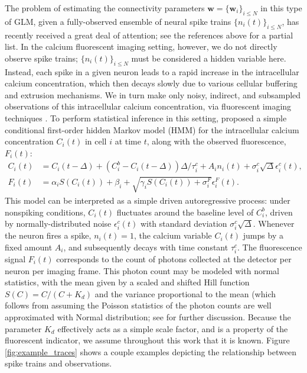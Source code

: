 \documentclass[aoas,preprint]{imsart}
\newcommand{\w}{w}
\newcommand{\bw}{\mathbf{\w}}
\begin{document}
The problem of estimating the connectivity parameters $\bw=\{\bw_i\}_{i\leq N}$ in this type of GLM, given a fully-observed ensemble of neural spike trains $\{n_i(t)\}_{i\leq N}$, has recently received a great deal of attention; see the references above for a partial list. In the calcium fluorescent imaging setting, however, we do not directly observe spike trains; $\{n_i(t)\}_{i\leq N}$ must be considered a hidden variable here. Instead, each spike in a given neuron leads to a rapid increase in the intracellular calcium concentration, which then decays slowly due to various cellular buffering and extrusion mechanisms. We in turn make only noisy, indirect, and subsampled observations of this intracellular calcium concentration, via fluorescent imaging techniques \cite{ImagingManual}. To perform statistical inference in this setting, \cite{Vogelstein2009} proposed a simple conditional first-order hidden Markov model (HMM) for the intracellular calcium concentration $C_i(t)$ in cell $i$ at time $t$, along with the observed fluorescence, $F_i(t)$:
\begin{align}
\label{eqn:ca:definition}
C_i(t) &= C_i(t-\Delta) + (C_i^b-C_i(t-\Delta)) \Delta/\tau^c_i + A_i
n_i(t)+\sigma^c_i \sqrt{\Delta} \epsilon^c_i(t), \\ F_i(t) &= \alpha_i
S(C_i(t)) + \beta_i + \sqrt{\gamma_i S(C_i(t)) + \sigma^F_i}
\epsilon^F_i(t). \label{eqn:F:definition}
\end{align}
This model can be interpreted as a simple driven autoregressive process: under nonspiking conditions, $C_i(t)$ fluctuates around the baseline level of $C_i^b$, driven by normally-distributed noise $\epsilon^c_i(t)$ with standard deviation $\sigma^c_i \sqrt{\Delta}$. Whenever the neuron fires a spike, $n_i(t)=1$, the calcium variable $C_i(t)$ jumps by a fixed amount $A_i$, and subsequently decays with time constant $\tau^c_i$. The fluorescence signal $F_i(t)$ corresponds to the count of photons collected at the detector per neuron per imaging frame. This photon count may be modeled with normal statistics, with the mean given by a scaled and shifted Hill function $S(C)=C/(C+K_d)$ \cite{Yasuda2004} and the variance proportional to the mean (which follows from assuming the Poisson statistics of the photon counts are well approximated with Normal distribution; see \cite{Vogelstein2009} for further discussion. Because the parameter $K_d$ effectively acts as a simple scale factor, and is a property of the fluorescent indicator, we assume throughout this work that it is known. Figure \ref{fig:example_traces} shows a couple examples depicting the relationship between spike trains and observations.
\end{document}
